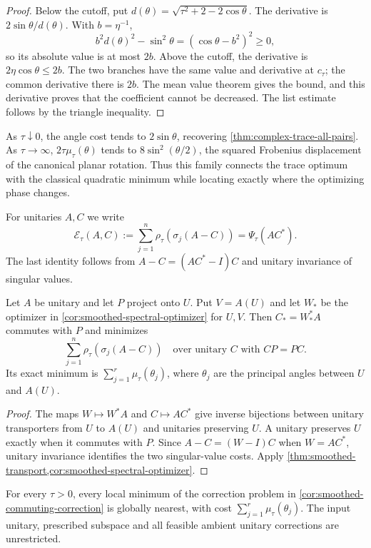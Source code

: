 \begin{proof}
Below the cutoff, put $d(\theta)=\sqrt{\tau^2+2-2\cos\theta}$.
The derivative is $2\sin\theta/d(\theta)$. With $b=\eta^{-1}$,
\[
 b^2d(\theta)^2-\sin^2\theta=(\cos\theta-b^2)^2\geq0,
\]
so its absolute value is at most $2b$. Above the cutoff, the derivative
is $2\eta\cos\theta\leq2b$. The two branches have the same value
and derivative at $c_\tau$; the common derivative there is $2b$.
The mean value theorem gives the bound, and this derivative proves that
the coefficient cannot be decreased. The list estimate follows by the
triangle inequality.
\end{proof}

As $\tau\downarrow0$, the angle cost tends to $2\sin\theta$, recovering
\cref{thm:complex-trace-all-pairs}. As $\tau\to\infty$,
$2\tau\mu_\tau(\theta)$ tends to $8\sin^2(\theta/2)$, the squared
Frobenius displacement of the canonical planar rotation. Thus this family
connects the trace optimum with the classical quadratic minimum while
locating exactly where the optimizing phase changes.

For unitaries $A,C$ we write
\[
 \mathcal E_\tau(A,C)
  :=\sum_{j=1}^n\rho_\tau(\sigma_j(A-C))
  =\Psi_\tau(AC^*).
\]
The last identity follows from $A-C=(AC^*-I)C$ and unitary
invariance of singular values.

\begin{corollary}
\label{cor:smoothed-commuting-correction}
Let $A$ be unitary and let $P$ project onto $U$. Put $V=A(U)$ and
let $W_*$ be the optimizer in \cref{cor:smoothed-spectral-optimizer}
for $U,V$. Then $C_*=W_*^*A$ commutes with $P$ and minimizes
\[
 \sum_{j=1}^n \rho_\tau(\sigma_j(A-C))
 \quad\text{over unitary }C\text{ with }CP=PC.
\]
Its exact minimum is $\sum_{j=1}^r\mu_\tau(\theta_j)$, where
$\theta_j$ are the principal angles between $U$ and $A(U)$.
\end{corollary}

\begin{proof}
The maps $W\mapsto W^*A$ and $C\mapsto AC^*$ give inverse
bijections between unitary transporters from $U$ to $A(U)$ and
unitaries preserving $U$. A unitary preserves $U$ exactly when it
commutes with $P$. Since $A-C=(W-I)C$ when $W=AC^*$, unitary
invariance identifies the two singular-value costs. Apply
\cref{thm:smoothed-transport,cor:smoothed-spectral-optimizer}.
\end{proof}

\begin{corollary}
\label{cor:smoothed-correction-local-global}
For every $\tau>0$, every local minimum of the correction problem in
\cref{cor:smoothed-commuting-correction} is globally nearest, with cost
$\sum_{j=1}^r\mu_\tau(\theta_j)$. The input unitary, prescribed
subspace and all feasible ambient unitary corrections are unrestricted.
\end{corollary}

